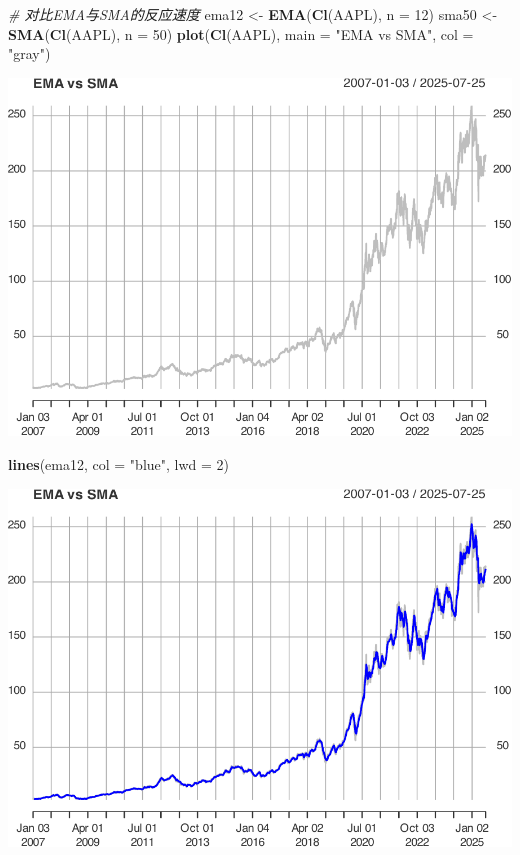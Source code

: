 \documentclass[]{ctexbook}
\newenvironment{Shaded}{\begin{snugshade}}{\end{snugshade}}
\newcommand{\AttributeTok}[1]{\textcolor[rgb]{0.13,0.29,0.53}{#1}}
\newcommand{\CommentTok}[1]{\textcolor[rgb]{0.56,0.35,0.01}{\textit{#1}}}
\newcommand{\DecValTok}[1]{\textcolor[rgb]{0.00,0.00,0.81}{#1}}
\newcommand{\FunctionTok}[1]{\textcolor[rgb]{0.13,0.29,0.53}{\textbf{#1}}}
\newcommand{\NormalTok}[1]{#1}
\newcommand{\OtherTok}[1]{\textcolor[rgb]{0.56,0.35,0.01}{#1}}
\newcommand{\StringTok}[1]{\textcolor[rgb]{0.31,0.60,0.02}{#1}}
\begin{document}
\begin{Shaded}
\begin{Highlighting}[]
\CommentTok{\# 对比EMA与SMA的反应速度}
\NormalTok{ema12 }\OtherTok{\textless{}{-}} \FunctionTok{EMA}\NormalTok{(}\FunctionTok{Cl}\NormalTok{(AAPL), }\AttributeTok{n =} \DecValTok{12}\NormalTok{)}
\NormalTok{sma50 }\OtherTok{\textless{}{-}} \FunctionTok{SMA}\NormalTok{(}\FunctionTok{Cl}\NormalTok{(AAPL), }\AttributeTok{n =} \DecValTok{50}\NormalTok{)}
\FunctionTok{plot}\NormalTok{(}\FunctionTok{Cl}\NormalTok{(AAPL), }\AttributeTok{main =} \StringTok{"EMA vs SMA"}\NormalTok{, }\AttributeTok{col =} \StringTok{"gray"}\NormalTok{)}
\end{Highlighting}
\end{Shaded}

\includegraphics[width=0.9\linewidth]{QuantmodHandbook_files/figure-latex/ema-4}

\begin{Shaded}
\begin{Highlighting}[]
\FunctionTok{lines}\NormalTok{(ema12, }\AttributeTok{col =} \StringTok{"blue"}\NormalTok{, }\AttributeTok{lwd =} \DecValTok{2}\NormalTok{)}
\end{Highlighting}
\end{Shaded}

\includegraphics[width=0.9\linewidth]{QuantmodHandbook_files/figure-latex/ema-5}
\end{document}
